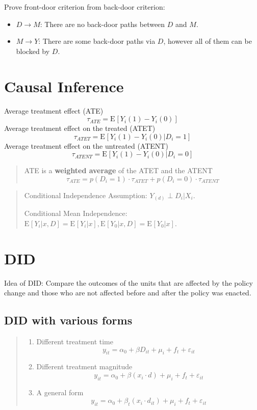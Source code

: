 \documentclass[
]{ctexart}
\providecommand{\tightlist}{%
  \setlength{\itemsep}{0pt}\setlength{\parskip}{0pt}}
\def\ve{\varepsilon}
\newcommand{\0}{\textbf 0}
\newcommand{\1}{\textbf 1}
\providecommand{\e}{}\renewcommand{\e}[2][]{\text{E}_{#1}\br{#2}}
\def\br#1{\left[#1\right]}
\def\pr#1{\left(#1\right)}
\begin{document}
Prove front-door criterion from back-door criterion:

\begin{itemize}
\tightlist
\item
  \(D\to M\): There are no back-door paths between \(D\) and \(M\).
\item
  \(M\to Y\): There are some back-door paths via \(D\), however all of
  them can be blocked by \(D\).
\end{itemize}

\hypertarget{causal-inference}{%
\section{Causal Inference}\label{causal-inference}}

Average treatment effect (ATE) \[
\tau_{ATE} = \e{Y_{i}\pr 1-Y_{i}\pr 0}
\] Average treatment effect on the treated (ATET) \[
\tau_{ATET} = \e{Y_{i}\pr 1-Y_{i}\pr 0|D_i = 1}
\] Average treatment effect on the untreated (ATENT) \[
\tau_{ATENT} = \e{Y_{i}\pr 1-Y_{i}\pr 0|D_i = 0}
\]

\begin{quote}
ATE is a \textbf{weighted average} of the ATET and the ATENT \[
\tau_{ATE} = p\pr{D_i = 1}\cdot \tau_{ATET}+p\pr{D_i = 0}\cdot \tau_{ATENT}
\]
\end{quote}

\begin{quote}
Conditional Independence Assumption: \(Y_{\pr{d}}\perp D_i |X_i\).

Conditional Mean Independence:
\(\e{Y_i|x,D} = \e{Y_i|x},\e{Y_0|x,D} = \e{Y_0|x}\).
\end{quote}

\hypertarget{did}{%
\section{DID}\label{did}}

Idea of DID: Compare the outcomes of the units that are affected by the
policy change and those who are not affected before and after the policy
was enacted.

\hypertarget{did-with-various-forms}{%
\subsection{DID with various forms}\label{did-with-various-forms}}

\begin{quote}
\begin{enumerate}
\def\labelenumi{\arabic{enumi}.}
\item
  Different treatment time \[
  y_{it} = \alpha_0+\beta D_{it}+\mu_i+f_t+\ve_{it}
  \]
\item
  Different treatment magnitude \[
  y_{it} = \alpha_0+\beta \pr{x_i\cdot d}+\mu_i+f_t+\ve_{it}
  \]
\item
  A general form \[
  y_{it} = \alpha_0 + \beta_t \pr{x_i\cdot d_{it}}+\mu_i+f_t+\ve_{it}
  \]
\end{enumerate}
\end{quote}
\end{document}
